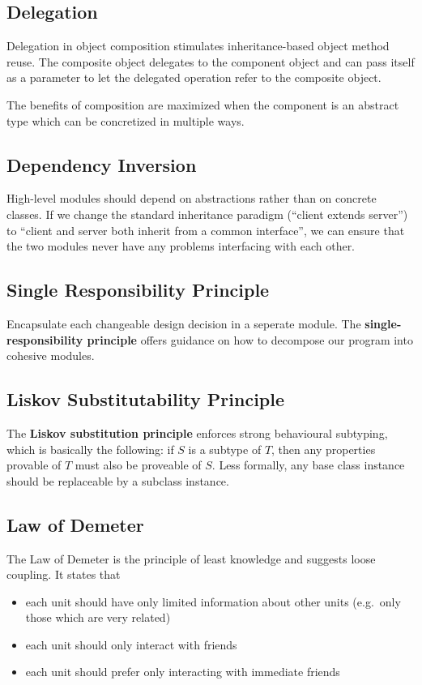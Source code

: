 \documentclass[12pt]{article}
\begin{document}
\subsection{Delegation}
Delegation in object composition stimulates inheritance-based object method reuse. The composite object delegates to the component object and can pass itself as a parameter to let the delegated operation refer to the composite object.

The benefits of composition are maximized when the component is an abstract type which can be concretized in multiple ways.

\subsection{Dependency Inversion}
High-level modules should depend on abstractions rather than on concrete classes. If we change the standard inheritance paradigm (``client extends server'') to ``client and server both inherit from a common interface'', we can ensure that the two modules never have any problems interfacing with each other.

\subsection{Single Responsibility Principle}
Encapsulate each changeable design decision in a seperate module. The {\bf single-responsibility principle} offers guidance on how to decompose our program into cohesive modules.

\subsection{Liskov Substitutability Principle}
The {\bf Liskov substitution principle} enforces strong behavioural subtyping, which is basically the following: if $S$ is a subtype of $T$, then any properties provable of $T$ must also be proveable of $S$. Less formally, any base class instance should be replaceable by a subclass instance.

\subsection{Law of Demeter}
The Law of Demeter is the principle of least knowledge and suggests loose coupling. It states that
\begin{itemize}
\item each unit should have only limited information about other units (e.g.\ only those which are very related)
\item each unit should only interact with friends
\item each unit should prefer only interacting with immediate friends
\end{itemize}
\end{document}
